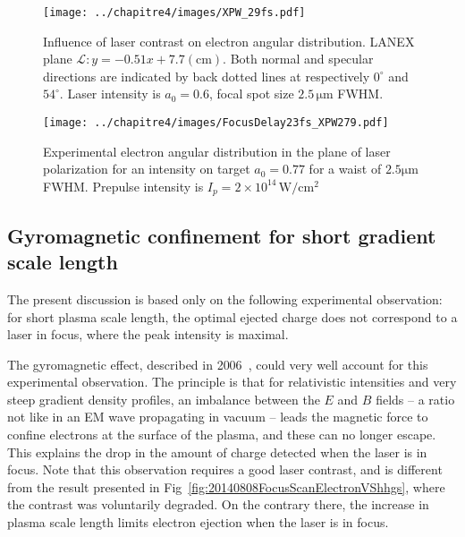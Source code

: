 \begin{figure}[H]
\centering
\texttt{[image: ../chapitre4/images/XPW\_29fs.pdf]}\\
\caption{\label{fig:XPW_29fs}Influence of laser contrast on electron angular distribution. LANEX plane $\mathcal{L}: y = -0.51 x + 7.7\mathrm{(cm)}$. Both normal and specular directions are indicated by back dotted lines at respectively $0^{\circ}$ and $54^{\circ}$. Laser intensity is $a_0 = 0.6$, focal spot size $2.5\,\mathrm{\mu m}$ FWHM. }
\end{figure}


\begin{figure}[H]
\centering
\texttt{[image: ../chapitre4/images/FocusDelay23fs\_XPW279.pdf]}\\
\caption{\label{fig:FocusDelay23fs_XPW279} Experimental electron angular distribution in the plane of laser polarization for an intensity on target $a_0 = 0.77$ for a waist of $\mathrm{2.5 \mu m}$ FWHM. Prepulse intensity is $I_p = 2\times 10^{14}\,\mathrm{W/cm^2}$}
\end{figure}



\subsection{Gyromagnetic confinement for short gradient scale length}\label{eq:Gyromagnetic confinement for short gradient scale lengths}

The present discussion is based only on the following experimental observation: for short plasma scale length, the optimal ejected charge does  not correspond to a laser in focus, where the peak intensity is maximal. 

\noindent The gyromagnetic effect, described in 2006~\cite{geindre2006relativistic}, could very well account for this experimental observation. The principle is that for relativistic intensities and very steep gradient density profiles, an imbalance between the $E$ and $B$ fields -- a ratio not like in an EM wave propagating in vacuum -- leads the magnetic force to confine electrons at the surface of the plasma, and these can no longer escape. This explains the drop in the amount of charge detected when the laser is in focus. Note that this observation requires a good laser contrast, and is different from the result presented in Fig~\ref{fig:20140808FocusScanElectronVShhgs}, where the contrast was voluntarily degraded. On the contrary there, the increase in plasma scale length limits electron ejection when the laser is in focus.

